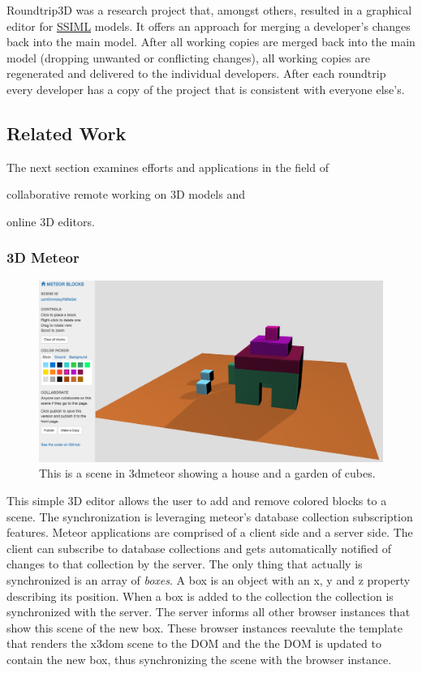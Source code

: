 Roundtrip3D was a research project that, amongst others, resulted in a
graphical editor for \hyperref[ssiml]{SSIML} models. It offers an
approach for merging a developer's changes back into the main model.
After all working copies are merged back into the main model (dropping
unwanted or conflicting changes), all working copies are regenerated and
delivered to the individual developers. After each roundtrip every
developer has a copy of the project that is consistent with everyone
else's.

\subsection{Related Work}
\label{related-work}

The next section examines efforts and applications in the field of

\begin{itemize*}
  \item collaborative remote working on \gls{3D} models and
  \item online \gls{3D} editors.
\end{itemize*}

\subsubsection{3D Meteor}
\label{d-meteor0}

\begin{figure}[htbp]
  \centering
  \includegraphics[width=12cm]{../assets/3dmeteor.png}
  \caption{This is a scene in 3dmeteor showing a house and a garden of cubes.}
	\label{fig:3dmeteor}
\end{figure}

This simple \gls{3D} editor allows the user to add and remove colored blocks to a
scene. The synchronization is leveraging meteor's database collection
subscription features. Meteor applications are comprised of a client side and a
server side. The client can subscribe to database collections and gets
automatically notified of changes to that collection by the server. The only
thing that actually is synchronized is an array of \emph{boxes}. A box is an
object with an x, y and z property describing its position. When a box is
added to the collection the collection is synchronized with the server. The
server informs all other browser instances that show this scene of the new box.
These browser instances reevalute the template that renders the x3dom scene to
the \gls{DOM} and the the \gls{DOM} is updated to contain the new box, thus synchronizing
the scene with the browser instance. \cite{3dmeteor}

